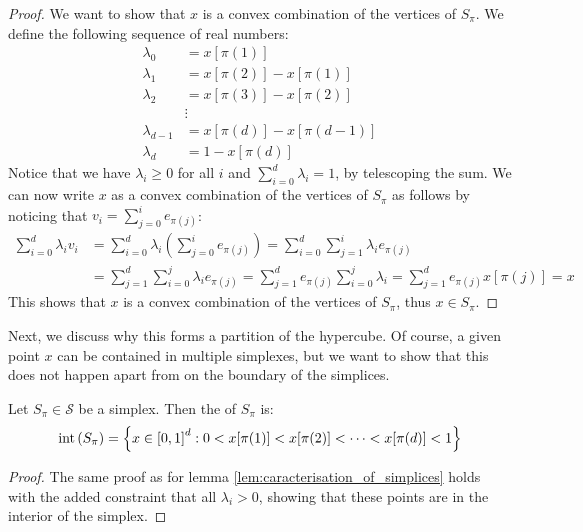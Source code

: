 \begin{proof}
	We want to show that $x$ is a convex combination of the vertices of $S_{\pi}$. We define the following sequence of real numbers:
	\begin{align*}
		\lambda_0     & = x[\pi(1)]               \\
		\lambda_1     & = x[\pi(2)] - x[\pi(1)]   \\
		\lambda_2     & = x[\pi(3)] - x[\pi(2)]   \\
		              & \vdots                    \\
		\lambda_{d-1} & = x[\pi(d)] - x[\pi(d-1)] \\
		\lambda_d     & = 1 - x[\pi(d)]
	\end{align*}
	Notice that we have $\lambda_i \geq 0$ for all $i$ and $\sum_{i=0}^{d} \lambda_i = 1$, by telescoping the sum. We can now write $x$ as a convex combination of the vertices of $S_{\pi}$ as follows by noticing that $v_i = \sum_{j=0}^{i} e_{\pi(j)}$:
	\begin{align*}
		\sum_{i=0}^{d} \lambda_i v_i & = \sum_{i=0}^{d} \lambda_i \left( \sum_{j=0}^{i} e_{\pi(j)} \right)  = \sum_{i=0}^{d} \sum_{j=1}^{i} \lambda_i e_{\pi(j)}                                             \\
		                             & = \sum_{j=1}^{d} \sum_{i=0}^{j} \lambda_i e_{\pi(j)}  = \sum_{j=1}^{d} e_{\pi(j)} \sum_{i=0}^{j} \lambda_i        = \sum_{j=1}^{d} e_{\pi(j)} x[\pi(j)]           = x
	\end{align*}
	This shows that $x$ is a convex combination of the vertices of $S_{\pi}$, thus $x \in S_{\pi}$.
\end{proof}
Next, we discuss why this forms a partition of the hypercube. Of course, a given point $x$ can be contained in multiple simplexes, but we want to show that this does not happen apart from on the boundary of the simplices.
\begin{lemma}
	Let $S_{\pi} \in \mathcal{S}$ be a simplex. Then the  of $S_{\pi}$ is:
	\begin{align*}
		\text{int}\left(S_{\pi}\right) = \left\{x \in {[0, 1]}^d : 0 < x[\pi(1)] < x[\pi(2)] < \cdots < x[\pi(d)] < 1\right\}
	\end{align*}
\end{lemma}
\begin{proof}
	The same proof as for lemma \cref{lem:caracterisation_of_simplices} holds with the added constraint that all $\lambda_i > 0$, showing that these points are in the interior of the simplex.
\end{proof}
